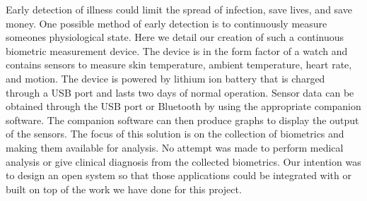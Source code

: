 Early detection of illness could limit the spread of infection, save lives, and
save money.  One possible method of early detection is to continuously measure
someones physiological state.  Here we detail our creation of such a continuous
biometric measurement device.  The device is in the form factor of a watch and
contains sensors to measure skin temperature, ambient temperature, heart rate,
and motion.  The device is powered by lithium ion battery that is charged
through a USB port and lasts two days of normal operation.  Sensor data can be
obtained through the USB port or Bluetooth by using the appropriate companion
software.  The companion software can then produce graphs to display the output
of the sensors.  The focus of this solution is on the collection of biometrics
and making them available for analysis.  No attempt was made to perform medical
analysis or give clinical diagnosis from the collected biometrics.  Our
intention was to design an open system so that those applications could be
integrated with or built on top of the work we have done for this project.
